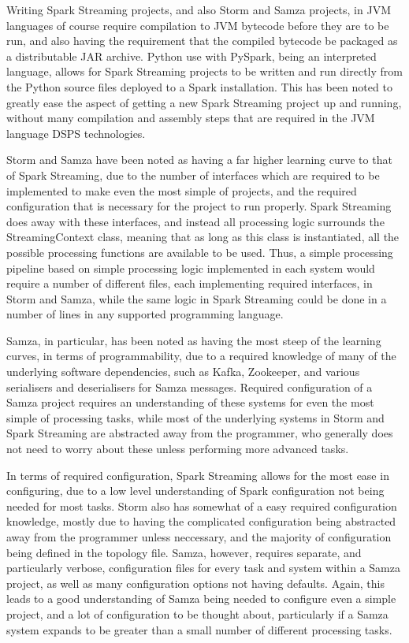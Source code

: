 Writing Spark Streaming projects, and also Storm and Samza projects,
in JVM languages of course require compilation to JVM bytecode before they are to be run, and also having the requirement
that the compiled bytecode be packaged as a distributable JAR archive. Python use with PySpark, being an
interpreted language, allows for Spark Streaming projects to be written and run directly from the Python source files
deployed to a Spark installation. This has been noted to greatly ease the aspect of getting a new Spark Streaming project
up and running, without many compilation and assembly steps that are required in the JVM language DSPS technologies.

Storm and Samza have been noted as having a far higher learning curve to that of Spark Streaming, due to the number of
interfaces which are required to be implemented to make even the most simple of projects, and the required configuration
that is necessary for the project to run properly. Spark Streaming does away with these interfaces, and instead all processing
logic surrounds the StreamingContext class, meaning that as long as this class is instantiated, all the possible processing
functions are available to be used. Thus, a simple processing pipeline based on simple processing logic implemented in each
system would require a number of different files, each implementing required interfaces, in Storm and Samza, while the
same logic in Spark Streaming could be done in a number of lines in any supported programming language.

Samza, in particular, has been noted as having the most steep of the learning curves, in terms of programmability, due
to a required knowledge of many of the underlying software dependencies, such as Kafka, Zookeeper, and various serialisers
and deserialisers for Samza messages. Required configuration of a Samza project requires an understanding of these systems for
even the most simple of processing tasks, while most of the underlying systems in Storm and Spark Streaming are abstracted
away from the programmer, who generally does not need to worry about these unless performing more advanced tasks.

In terms of required configuration, Spark Streaming allows for the most ease in configuring, due to a low level understanding
of Spark configuration not being needed for most tasks. Storm also has somewhat of a easy required configuration knowledge,
mostly due to having the complicated configuration being abstracted away from the programmer unless neccessary, and the
majority of configuration being defined in the topology file. Samza, however, requires separate, and particularly verbose,
configuration files for every task and system within a Samza project, as well as many configuration options not having
defaults. Again, this leads to a good understanding of Samza being needed to configure even a simple project, and a lot
of configuration to be thought about, particularly if a Samza system expands to be greater than a small number of different
processing tasks.

